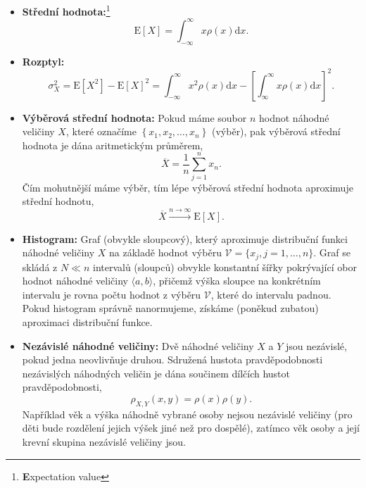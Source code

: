 \documentclass[a4paper,11pt,twoside]{article}
\renewcommand{\d}{\mathrm{d}}
\def\expectation#1{\mathrm{E}\left[#1\right]}
\def\dispersion#1{\sigma_{#1}^{2}}
\theoremstyle{red}
\theoremstyle{green}
\begin{document}
\begin{itemize}
            \item {\bf Střední hodnota:}\footnote{{\bf E}xpectation value}
                \begin{equation}
                    \label{eq:Expectation}
                    \expectation{X}=\int_{-\infty}^{\infty}x\rho(x)\d x.
                \end{equation}

            \item {\bf Rozptyl:}
                \begin{equation}
                    \label{eq:Dispersion}
                    \dispersion{X}
                        =\expectation{X^{2}}-\expectation{X}^{2}
                        =\int_{-\infty}^{\infty}x^{2}\rho(x)\d x-\left[\int_{\infty}^{\infty}x\rho(x)\d x\right]^{2}.
                \end{equation}

            \item {\bf Výběrová střední hodnota:} 
                Pokud máme soubor $n$ hodnot náhodné veličiny $X$, které označíme $\left\{x_{1},x_{2},\dotsc,x_{n}\right\}$ (výběr), pak výběrová střední hodnota je dána aritmetickým průměrem,
                \begin{equation}
                    \overline{X}=\frac{1}{n}\sum_{j=1}^{n}x_{n}.
                \end{equation}
                Čím mohutnější máme výběr, tím lépe výběrová střední hodnota aproximuje střední hodnotu,
                \begin{equation}
                    \overline{X}\xrightarrow{n\rightarrow\infty}\expectation{X}.
                \end{equation}

            \item {\bf Histogram:}
                Graf (obvykle sloupcový), který aproximuje distribuční funkci náhodné veličiny $X$ na základě hodnot výběru $\mathcal{V}=\{x_{j},j=1,\dotsc,n\}$.
                Graf se skládá z $N\ll n$ intervalů (sloupců) obvykle konstantní šířky pokrývající obor hodnot náhodné veličiny $\langle a,b\rangle$, přičemž výška sloupce na konkrétním intervalu je rovna počtu hodnot z výběru $\mathcal{V}$, které do intervalu padnou.
                Pokud histogram správně nanormujeme, získáme (poněkud zubatou) aproximaci distribuční funkce.

            \item{\bf Nezávislé náhodné veličiny:}
                Dvě náhodné veličiny $X$ a $Y$ jsou nezávislé, pokud jedna neovlivňuje druhou.
                Sdružená hustota pravděpodobnosti nezávislých náhodných veličin je dána součinem dílčích hustot pravděpodobnosti,
                \begin{equation}
                    \rho_{X,Y}(x,y)=\rho(x)\rho(y).
                \end{equation}
                Například věk a výška náhodně vybrané osoby nejsou nezávislé veličiny (pro děti bude rozdělení jejich výšek jiné než pro dospělé), zatímco věk osoby a její krevní skupina nezávislé veličiny jsou.


\end{itemize}
\end{document}
